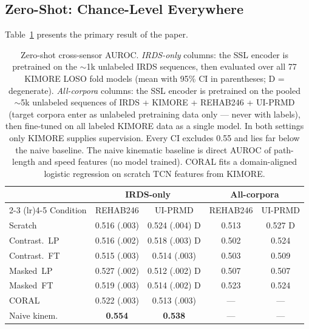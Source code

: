 \documentclass[10pt,journal]{IEEEtran}
\begin{document}
\subsection{Zero-Shot: Chance-Level Everywhere}
\label{sec:zeroshot-results}

Table~\ref{tab:zeroshot} presents the primary result of the paper.

\begin{table}[t]
\centering
\caption{Zero-shot cross-sensor AUROC. \emph{IRDS-only} columns: the SSL encoder is pretrained on the $\sim$1k unlabeled IRDS sequences, then evaluated over all 77 KIMORE LOSO fold models (mean with 95\% CI in parentheses; D = degenerate). \emph{All-corpora} columns: the SSL encoder is pretrained on the pooled $\sim$5k unlabeled sequences of IRDS + KIMORE + REHAB246 + UI-PRMD (target corpora enter as unlabeled pretraining data only --- never with labels), then fine-tuned on all labeled KIMORE data as a single model. In both settings only KIMORE supplies supervision. Every CI excludes 0.55 and lies far below the naive baseline. The naive kinematic baseline is direct AUROC of path-length and speed features (no model trained). CORAL fits a domain-aligned logistic regression on scratch TCN features from KIMORE.}
\label{tab:zeroshot}
\small
\setlength{\tabcolsep}{2.5pt}
\begin{tabular}{@{}lcccc@{}}
\toprule
& \multicolumn{2}{c}{IRDS-only} & \multicolumn{2}{c}{All-corpora} \\
\cmidrule(lr){2-3} \cmidrule(lr){4-5}
Condition & REHAB246 & UI-PRMD & REHAB246 & UI-PRMD \\
\midrule
Scratch         & 0.516 (.003)  & 0.524 (.004) D & 0.513 & 0.527 D \\
Contrast.~LP    & 0.516 (.002)  & 0.518 (.003) D & 0.502 & 0.524 \\
Contrast.~FT    & 0.515 (.003)  & 0.514 (.003)   & 0.503 & 0.509 \\
Masked~LP       & 0.527 (.002)  & 0.512 (.002) D & 0.507 & 0.507 \\
Masked~FT       & 0.519 (.003)  & 0.514 (.002) D & 0.523 & 0.524 \\
\midrule
CORAL           & 0.522 (.003)  & 0.513 (.003)   & ---   & --- \\
\midrule
Naive kinem.    & \textbf{0.554} & \textbf{0.538} & ---   & --- \\
\bottomrule
\end{tabular}
\end{table}
\end{document}
